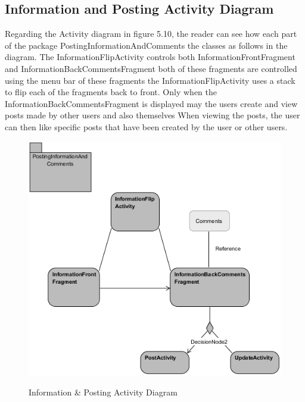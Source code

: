 \newpage

\subsection{Information and Posting Activity Diagram}
Regarding the Activity diagram in figure 5.10, the reader can see how each part of the package PostingInformationAndComments the classes as follows in the diagram. The InformationFlipActivity controls both InformationFrontFragment and InformationBackCommentsFragment both of these fragments are controlled using the menu bar of these fragments the InformationFlipActivity uses a stack to flip each of the fragments back to front. Only when the InformationBackCommentsFragment is displayed may the users create and view posts made by other users and also themselves When viewing the posts, the user can then like specific posts that have been created by the user or other users.\par

\begin{figure}[htbp]
    \center \includegraphics[width=350pt]{PostingInformation}\\
    \caption{Information \& Posting Activity Diagram} \label{Figure: Information & Posting Activity Diagram }
\end{figure}

\newpage

